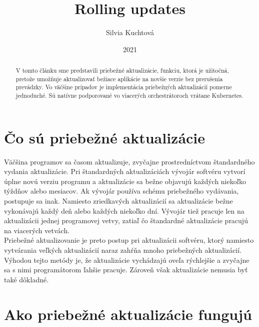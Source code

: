 \documentclass[12pt, a4paper, twoside]{article}
\title{Rolling updates}
\author{Silvia Kuchtová}
\date{2021}
\begin{document}
	\maketitle
\begin{abstract}

	V tomto článku sme predstavili priebežné aktualizácie, funkciu, ktorá je užitočná, pretože umožňuje aktualizovať bežiace aplikácie na novšie verzie bez prerušenia prevádzky. Vo väčšine prípadov je implementácia priebežných aktualizácií pomerne jednoduché. Sú natívne podporované vo viacerých orchestrátoroch vrátane Kubernetes.
\end{abstract}

\section{Čo sú priebežné aktualizácie}

	Väčšina programov sa časom aktualizuje, zvyčajne prostredníctvom štandardného vydania aktualizácie. Pri štandardných aktualizáciách vývojár softvéru vytvorí úplne novú verziu programu a aktualizácie sa bežne objavujú každých niekoľko týždňov alebo mesiacov. Ak vývojár používa schému priebežného vydávania, postupuje sa inak. Namiesto zriedkavých aktualizácií sa aktualizácie bežne vykonávajú každý deň alebo každých niekoľko dní. Vývojár tiež pracuje len na aktualizácii jednej programovej vetvy, zatiaľ čo štandardné aktualizácie pracujú na viacerých vetvách.\\
Priebežné aktualizovanie je preto postup pri aktualizácii softvéru, ktorý namiesto vytvárania veľkých aktualizácií naraz zahŕňa mnoho priebežných aktualizácií.  Výhodou tejto metódy je, že aktualizácie vychádzajú oveľa rýchlejšie a zvyčajne sa s nimi programátorom ľahšie pracuje. Zároveň však aktualizácie nemusia byť také dôkladné.\\

\section{Ako priebežné aktualizácie fungujú}
\end{document}

